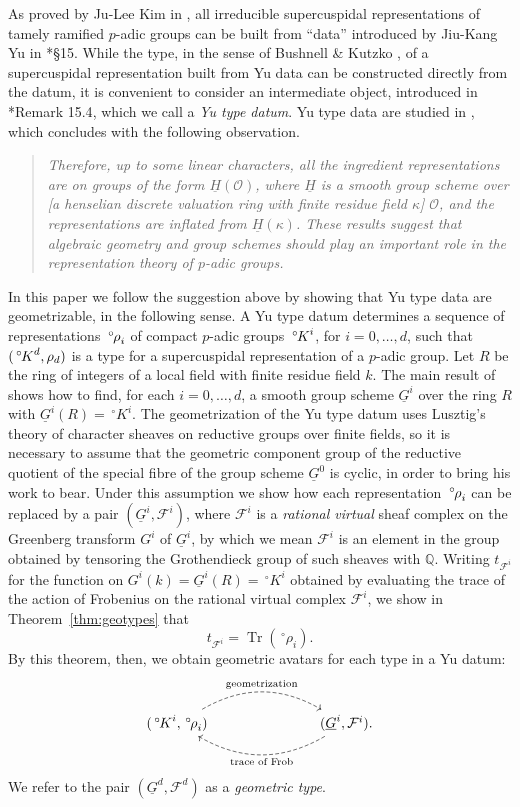 \documentclass[10pt]{amsart}
\theoremstyle{plain}
\theoremstyle{definition}
\newcommand{\QQ}{{\mathbb{Q}}}
\DeclareMathOperator{\trace}{Tr}
\newcommand{\trFrob}[1]{t_{#1}}
\newcommand{\cs}[1]{{\mathcal{#1}}}
\newcommand{\oK}{{\,^\circ \hskip-1pt K}}
\newcommand{\orho}{{\,^\circ \hskip-1pt \rho}}
\begin{document}
As proved by Ju-Lee Kim in \cite{kim:07a}, all irreducible supercuspidal representations of tamely ramified $p$-adic groups can be built from ``data'' introduced by Jiu-Kang Yu in \cite{yu:01a}*{\S 15}.
While the type, in the sense of Bushnell \& Kutzko \cite{bushnell-kutzko:98a}, of a supercuspidal representation built from Yu data can be constructed directly from the datum, it is convenient to consider an intermediate object, introduced in \cite{yu:01a}*{Remark 15.4}, which we call a \emph{Yu type datum}. 
Yu type data are studied in \cite{Yu:models}, which concludes with the following observation.
\begin{quotation}
{\it Therefore, up to some linear characters, all the ingredient representations 
 are on groups of the form $\underline{H}(\mathcal{O})$, where $\underline{H}$ is a smooth group scheme over [a henselian discrete valuation ring with finite residue field $\kappa$] $\mathcal{O}$, and the representations are inflated from $\underline{H}(\kappa)$. These results suggest that algebraic geometry and group schemes should play an
important role in the representation theory of $p$-adic groups.}
\end{quotation}
In this paper we follow the suggestion above by showing that Yu type data are geometrizable, in the following sense.
A Yu type datum determines a sequence of representations $\orho_i$ of compact $p$-adic groups $\oK^i$, for $i=0, \ldots, d$, such that $(\oK^d, \rho_d)$ is a type for a supercuspidal representation of a $p$-adic group.
Let $R$ be the ring of integers of a local field with finite residue field $k$.
The main result of \cite{Yu:models} shows how to find, for each $i=0, \ldots, d$, a smooth group scheme $\underline{G}^i$ over the ring $R$ with $\underline{G}^i(R)=\,^\circ K^i $.
The geometrization of the Yu type datum uses Lusztig's theory of character sheaves on reductive groups over finite fields, so it is necessary to assume that the geometric component group of the reductive quotient of the special fibre of the group scheme $\underline{G}^0$ is cyclic, in order to bring his work to bear. Under this assumption we show how each representation $\orho_i$ can be replaced by a pair $(\underline{G}^i, \cs{F}^i)$, where $\cs{F}^i$ is a {\it rational virtual} sheaf complex on the Greenberg transform $G^i$ of $\underline{G}^i$, by which we mean $\cs{F}^i$ is an element in the group obtained by tensoring the Grothendieck group of such sheaves with $\QQ$. 
Writing $\trFrob{\cs{F}^i}$ for the function on $G^i(k) = \underline{G}^i(R) = \,^\circ K^i$ obtained by evaluating the trace of the action of Frobenius on the rational virtual complex $\cs{F}^i$, we show in Theorem~\ref{thm:geotypes} that 
\begin{equation}\label{eqn:intro1}
\trFrob{\cs{F}^i} = \trace(\,^\circ\rho_i).
\end{equation}
By this theorem, then, we obtain geometric avatars for each type in a Yu datum:
\[
\begin{tikzcd}
(\oK^i,\orho_i) \arrow[bend left, dashed]{rrr}{\text{geometrization}} &&& \arrow[bend left, dashed]{lll}{\text{trace of Frob}}
(\underline{G}^i, \cs{F}^i).
\end{tikzcd}
\]
We refer to the pair $(\underline{G}^d, \cs{F}^d)$ as a \emph{geometric type}.
\end{document}
